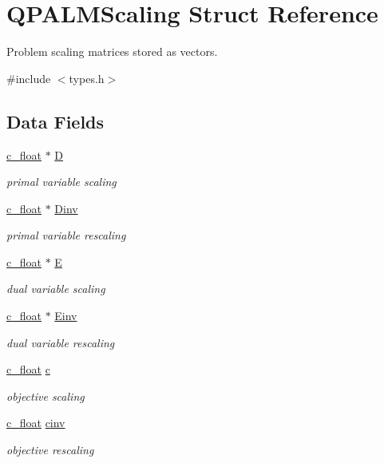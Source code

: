 \hypertarget{structQPALMScaling}{}\section{Q\+P\+A\+L\+M\+Scaling Struct Reference}
\label{structQPALMScaling}


Problem scaling matrices stored as vectors.  




{\ttfamily \#include $<$types.\+h$>$}

\subsection*{Data Fields}
\begin{DoxyCompactItemize}
\item 
\mbox{\hyperlink{global__opts_8h_a7f1a9fda95e52979658c20a0d134fb15}{c\+\_\+float}} $\ast$ \mbox{\hyperlink{structQPALMScaling_ad1acc3ea936bca94d4a166dee8c92bd9}{D}}
\begin{DoxyCompactList}\small\item\em primal variable scaling \end{DoxyCompactList}\item 
\mbox{\hyperlink{global__opts_8h_a7f1a9fda95e52979658c20a0d134fb15}{c\+\_\+float}} $\ast$ \mbox{\hyperlink{structQPALMScaling_a1811ba868f52b35ae61afe4850c7068a}{Dinv}}
\begin{DoxyCompactList}\small\item\em primal variable rescaling \end{DoxyCompactList}\item 
\mbox{\hyperlink{global__opts_8h_a7f1a9fda95e52979658c20a0d134fb15}{c\+\_\+float}} $\ast$ \mbox{\hyperlink{structQPALMScaling_a8e0f516b3576cb21c6775008f42a6b41}{E}}
\begin{DoxyCompactList}\small\item\em dual variable scaling \end{DoxyCompactList}\item 
\mbox{\hyperlink{global__opts_8h_a7f1a9fda95e52979658c20a0d134fb15}{c\+\_\+float}} $\ast$ \mbox{\hyperlink{structQPALMScaling_a8e9adc9bd55190204f3d4f0a862e55cb}{Einv}}
\begin{DoxyCompactList}\small\item\em dual variable rescaling \end{DoxyCompactList}\item 
\mbox{\hyperlink{global__opts_8h_a7f1a9fda95e52979658c20a0d134fb15}{c\+\_\+float}} \mbox{\hyperlink{structQPALMScaling_a4f98c16d0423437efedba58fcf266114}{c}}
\begin{DoxyCompactList}\small\item\em objective scaling \end{DoxyCompactList}\item 
\mbox{\hyperlink{global__opts_8h_a7f1a9fda95e52979658c20a0d134fb15}{c\+\_\+float}} \mbox{\hyperlink{structQPALMScaling_aaea7f6c4b7a75e588c98f37f3f20a0d7}{cinv}}
\begin{DoxyCompactList}\small\item\em objective rescaling \end{DoxyCompactList}\end{DoxyCompactItemize}


